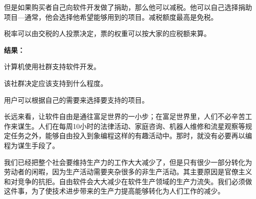 但是如果购买者自己向软件开发做了捐助，那么他可以减税。他可以自己选择捐助项目—通常，他会选择他希望能够用到的项目。减税额度最高是免税。\par
税率可以由交税的人投票决定，票的权重可以按大家的应税额来算。\par
\bf 结果：\normalall\par
计算机使用社群支持软件开发。\par
该社群决定应该支持到什么程度。\par
用户可以根据自己的需要来选择要支持的项目。\par
长远来看，让软件自由是通往富足世界的一小步；在富足世界里，人们不必辛苦工作来谋生。人们在每周10小时的法律活动、家庭咨询、机器人维修和流星观察等规定任务之外，能够自由投入到象编程这样的有趣活动中。那时，就没有必要再以编程为谋生手段了。\par
我们已经把整个社会要维持生产力的工作大大减少了，但是只有很少一部分转化为劳动者的闲暇，因为生产活动需要夹杂很多的非生产活动。其主要原因是官僚主义和对竞争的抗拒。自由软件会大大减少在软件生产领域的生产力流失。我们必须做这件事，为了使技术进步带来的生产力提高能够转化为人们工作的减少。